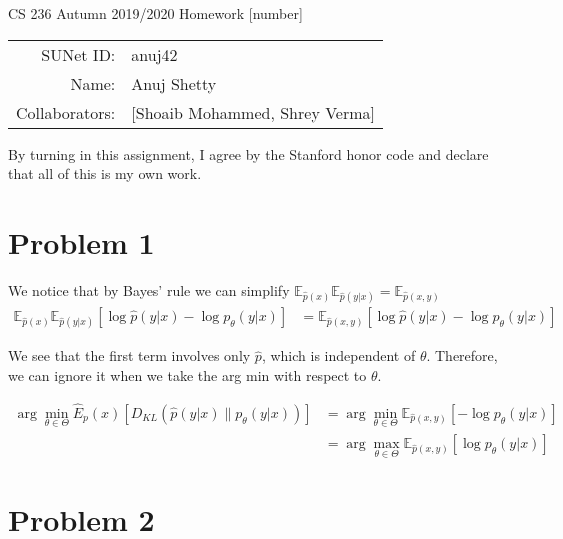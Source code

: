 \documentclass[12pt]{article}
\begin{document}
\begin{center}
{\Large CS 236 Autumn 2019/2020 Homework [number]}

\begin{tabular}{rl}
SUNet ID: & anuj42 \\
Name: & Anuj Shetty \\
Collaborators: & [Shoaib Mohammed, Shrey Verma]
\end{tabular}
\end{center}

By turning in this assignment, I agree by the Stanford honor code and declare
that all of this is my own work.

\section*{Problem 1}
We notice that by Bayes' rule we can simplify  $\mathbb{E}_{\hat{p}(x)} \mathbb{E}_{\hat{p}(y|x)} = \mathbb{E}_{\hat{p}(x, y)} $ \\
\begin{align*}
  \mathbb{E}_{\hat{p}(x)} \mathbb{E}_{\hat{p}(y|x)} [\log \hat{p} (y|x) - \log p_\theta (y | x)]  
  &= \mathbb{E}_{\hat{p}(x,y)} [\log \hat{p} (y|x) - \log p_\theta (y | x)]  
\end{align*}

We see that the first term involves only $\hat{p}$, which is independent of $\theta$. Therefore, we can ignore it when we take the arg min with respect to $\theta$. 

\begin{align*}
  \arg \min_{\theta \in \Theta} \hat{E}_p(x) [D_{KL}(\hat{p}(y | x) \parallel p_\theta(y | x))]  
  &= \arg \min_{\theta \in \Theta} \mathbb{E}_{\hat{p}(x,y)} [- \log p_\theta (y | x)] \\
  &= \arg \max_{\theta \in \Theta} \mathbb{E}_{\hat{p}(x,y)} [\log p_\theta (y | x)]
\end{align*}


\section*{Problem 2}
\end{document}
